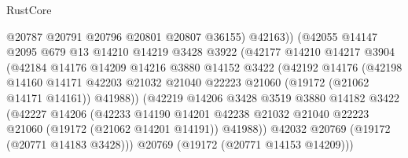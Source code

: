 \begin{lexlean}{RustCore}
\begin{coremodule}
                                @20787
                                @20791
                                @20796
                                @20801
                                @20807
                                @36155)
                              @42163))
                          (@42055
                            @14147
                            @2095
                            @679
                            @13
                            @14210
                            @14219
                            @3428
                            @3922
                            (@42177
                              @14210
                              @14217
                              @3904
                              (@42184
                                @14176
                                @14209
                                @14216
                                @3880
                                @14152
                                @3422
                                (@42192
                                  @14176
                                  (@42198
                                    @14160
                                    @14171
                                    @42203
                                    @21032
                                    @21040
                                    @22223
                                    @21060
                                    (@19172 (@21062 @14171 @14161))
                                    @41988))
                                (@42219
                                  @14206
                                  @3428
                                  @3519
                                  @3880
                                  @14182
                                  @3422
                                  (@42227
                                    @14206
                                    (@42233
                                      @14190
                                      @14201
                                      @42238
                                      @21032
                                      @21040
                                      @22223
                                      @21060
                                      (@19172 (@21062 @14201 @14191))
                                      @41988))
                                  @42032
                                  @20769
                                  (@19172 (@20771 @14183 @3428)))
                                @20769
                                (@19172 (@20771 @14153 @14209)))

\end{coremodule}
\end{lexlean}
